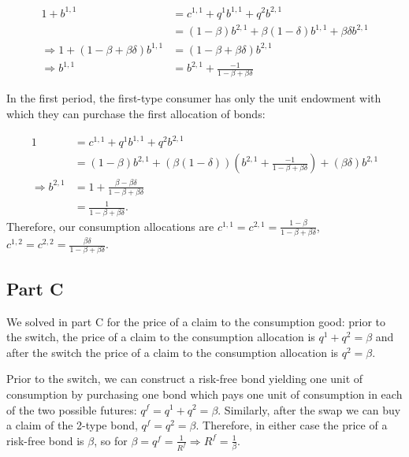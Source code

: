 \documentclass[11pt]{article} %
\begin{document}
\begin{align*}
1+b^{1,1}&= c^{1,1} + q^1b^{1,1} + q^2b^{2,1}\\
&=  (1-\beta)b^{2,1} + \beta(1-\delta)b^{1,1} +  \beta \delta b^{2,1} \\
\Rightarrow 1+(1-\beta + \beta \delta)b^{1,1} &= (1-\beta+\beta\delta)b^{2,1}\\
\Rightarrow b^{1,1}  &=  b^{2,1}+\frac{-1}{1-\beta + \beta \delta}
\end{align*}


In the first period, the first-type consumer has only the unit endowment with which they can purchase the first allocation of bonds:

\begin{align*}
1 &= c^{1,1} + q^1b^{1,1} + q^2b^{2,1}\\
 &= (1-\beta)b^{2,1} + ( \beta(1-\delta))\left( b^{2,1}+\frac{-1}{1-\beta + \beta \delta}\right) + (\beta\delta)b^{2,1}\\
\Rightarrow  b^{2,1} &= 1 + \frac{\beta - \beta\delta}{1-\beta + \beta\delta}\\
&= \frac{1}{1-\beta + \beta\delta}. 
\end{align*}
Therefore, our consumption allocations are $c^{1,1} = c^{2,1} = \frac{1-\beta}{1-\beta + \beta\delta}$, $c^{1,2} = c^{2,2} = \frac{\beta\delta}{1-\beta + \beta\delta}.$
\subsection{Part C}

We solved in part C for the price of a claim to the consumption good: prior to the switch, the price of a claim to the consumption allocation is  $q^1+q^2 = \beta $ and after the switch the price of a claim to the consumption allocation is $q^2 = \beta$.

Prior to the switch, we can construct a risk-free bond yielding one unit of consumption by purchasing one bond which pays one unit of consumption in each of the two possible futures: $q^f = q^1 + q^2 = \beta$. Similarly, after the swap we can buy a claim of the 2-type bond, $q^f = q^2 = \beta$. Therefore, in either case the price of a risk-free bond is $\beta$, so for $\beta = q^f = \frac{1}{R^f} \Rightarrow R^f = \frac{1}{\beta} $.
\end{document}
